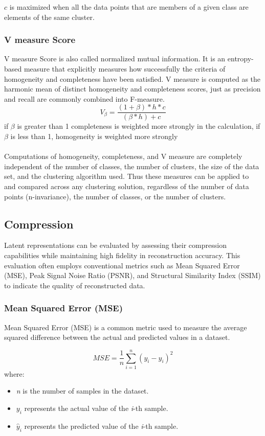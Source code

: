 \documentclass{article}
\begin{document}
    \(c\) is maximized when all the data points that are members of a given class are elements of the same cluster.
    
    \subsubsection{V measure Score}
    V measure Score is also called normalized mutual information. It is an entropy-based measure that explicitly measures how successfully the criteria of homogeneity and completeness have been satisfied. V measure is computed as the harmonic mean of distinct homogeneity and completeness scores, just as precision and recall are commonly combined into F-measure.    
\[
V_{\beta} = \frac{(1+\beta) * h * c}{(\beta * h)+c}
\]
if \(\beta\) is greater than 1 completeness is weighted more strongly in the calculation, if  \(\beta\) is less than 1, homogeneity is weighted more strongly 
\\\\
Computations of homogeneity, completeness, and V measure are completely independent of the number of classes, the number of clusters, the size of the data set, and the clustering algorithm used. Thus these measures can be applied to and compared across any clustering solution, regardless of the number of data points (n-invariance), the number of classes, or the number of clusters. 
    \subsection{Compression}
    Latent representations can be evaluated by assessing their compression capabilities while maintaining high fidelity in reconstruction accuracy.  This evaluation often employs conventional metrics such as Mean Squared Error (MSE), Peak Signal Noise Ratio (PSNR), and Structural Similarity Index (SSIM) to indicate the quality of reconstructed data. 
        \subsubsection{Mean Squared Error (MSE)}
        Mean Squared Error (MSE) is a common metric used to measure the average squared difference between the actual and predicted values in a dataset. 
        
\[MSE = \frac{1}{n} \sum_{i=1}^{n} (y_i - \hat{y}_i)^2\]
where:

\begin{itemize}
    \item \textit{n} is the number of samples in the dataset.
    \item \(y_i \) represents the actual value of the \textit{i}-th sample.
    \item \(\hat{y}_i\) represents the predicted value of the \textit{i}-th sample.
\end{itemize}
 
\end{document}
